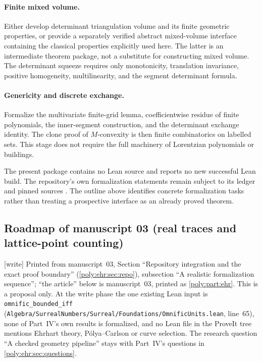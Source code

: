 \documentclass[11pt,a4paper]{article}
\numberwithin{equation}{section}
\theoremstyle{plain}
\newcommand{\wtag}{\textup{[write]}}%
\newcommand{\pathcode}[1]{\nolinkurl{#1}}
\begin{document}
\paragraph{Finite mixed volume.}
Either develop determinant triangulation volume and its finite geometric
properties, or provide a separately verified abstract mixed-volume
interface containing the classical properties explicitly used here.
The latter is an intermediate theorem package, not a substitute for
constructing mixed volume. The determinant squeeze requires only
monotonicity, translation invariance, positive homogeneity,
multilinearity, and the segment determinant formula.

\paragraph{Genericity and discrete exchange.}
Formalize the multivariate finite-grid lemma, coefficientwise residue of
finite polynomials, the inner-segment construction, and the determinant
exchange identity. The clone proof of $M$-convexity is then finite
combinatorics on labelled sets. This stage does not require the full
machinery of Lorentzian polynomials or buildings.

The present package contains no Lean source and reports no new successful
Lean build. The repository's own formalization statements remain subject
to its ledger and pinned sources \cite{mv:RepoSurreal}. The outline above
identifies concrete formalization tasks rather than treating a prospective
interface as an already proved theorem.

\subsection{Roadmap of manuscript 03 (real traces and lattice-point counting)}\label{poly:ehr:sec:formalization}
\wtag{} Printed from manuscript~03, Section ``Repository integration and
the exact proof boundary'' (\cref{poly:ehr:sec:repo}), subsection ``A
realistic formalization sequence''; ``the article'' below is manuscript~03,
printed as \cref{poly:part:ehr}. This is a proposal only. At the write
phase the one existing Lean input is \texttt{omnific\_bounded\_iff}
(\pathcode{Algebra/SurrealNumbers/Surreal/Foundations/OmnificUnits.lean},
line~65), none of Part~IV's own results is formalized, and no Lean file in
the ProveIt tree mentions Ehrhart theory, P\'olya--Carlson or curve
selection. The research question ``A checked geometry pipeline'' stays with
Part~IV's questions in \cref{poly:ehr:sec:questions}.
\end{document}
